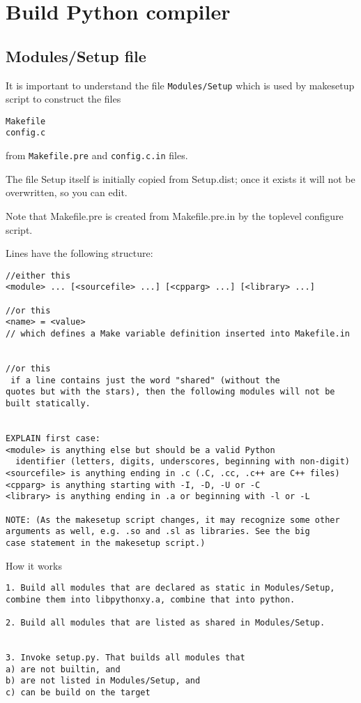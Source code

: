 \chapter{Build Python compiler}

\section{Modules/Setup file}

It is important to understand the file \verb!Modules/Setup! which is used by
makesetup script to construct the files 
\begin{verbatim}
Makefile
config.c
\end{verbatim}
from \verb!Makefile.pre! and \verb!config.c.in! files.

The file Setup itself is initially copied from Setup.dist; once it exists it
will not be overwritten, so you can edit.

Note that Makefile.pre is created from Makefile.pre.in by the toplevel configure
script.

Lines have the following structure:
\begin{verbatim}
//either this
<module> ... [<sourcefile> ...] [<cpparg> ...] [<library> ...]

//or this
<name> = <value>
// which defines a Make variable definition inserted into Makefile.in


//or this
 if a line contains just the word "shared" (without the
quotes but with the stars), then the following modules will not be
built statically. 


EXPLAIN first case:
<module> is anything else but should be a valid Python
  identifier (letters, digits, underscores, beginning with non-digit)
<sourcefile> is anything ending in .c (.C, .cc, .c++ are C++ files)
<cpparg> is anything starting with -I, -D, -U or -C
<library> is anything ending in .a or beginning with -l or -L

NOTE: (As the makesetup script changes, it may recognize some other
arguments as well, e.g. .so and .sl as libraries. See the big
case statement in the makesetup script.)
\end{verbatim}


How it works
\begin{verbatim}
1. Build all modules that are declared as static in Modules/Setup,
combine them into libpythonxy.a, combine that into python.

2. Build all modules that are listed as shared in Modules/Setup.


3. Invoke setup.py. That builds all modules that
a) are not builtin, and
b) are not listed in Modules/Setup, and
c) can be build on the target 
\end{verbatim}

